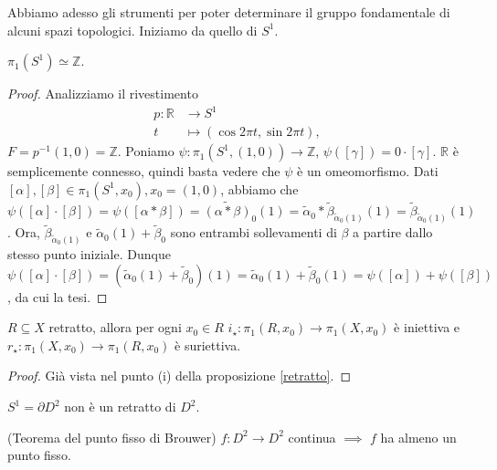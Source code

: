 Abbiamo adesso gli strumenti per poter determinare il gruppo fondamentale di alcuni spazi topologici. Iniziamo da quello di $S^1$.

\begin{thm}
  $\pi_1(S^1) \simeq \mathbb{Z}$.
\end{thm}

\begin{proof}
  Analizziamo il rivestimento
  \begin{align*}
    p: \mathbb{R} &\longrightarrow S^1 \\
    t &\longmapsto (\cos{2\pi t}, \sin{2\pi t}),
  \end{align*}
  $F=p^{-1}(1, 0)=\mathbb{Z}$. Poniamo $\psi:\pi_1(S^1, (1, 0)) \longrightarrow \mathbb{Z}$, $\psi([\gamma])=0 \cdot [\gamma]$. $\mathbb{R}$ è semplicemente connesso, quindi basta vedere che $\psi$ è un omeomorfismo.
  Dati $[\alpha], [\beta] \in \pi_1(S^1, x_0), x_0=(1, 0)$,
  abbiamo che $\psi([\alpha] \cdot [\beta])=\psi([\alpha * \beta])=\widetilde{(\alpha * \beta)}_0(1)=\tilde{\alpha}_0*\tilde{\beta}_{\tilde{\alpha}_0(1)}(1)=\tilde{\beta}_{\tilde{\alpha}_0(1)}(1)$.
  Ora, $\tilde{\beta}_{\tilde{\alpha}_0(1)}$ e $\tilde{\alpha}_0(1)+\tilde{\beta}_0$ sono entrambi sollevamenti di $\beta$ a partire dallo stesso punto iniziale.
  Dunque $\psi([\alpha] \cdot [\beta])=(\tilde{\alpha}_0(1)+\tilde{\beta}_0)(1)=\tilde{\alpha}_0(1)+\tilde{\beta}_0(1)=\psi([\alpha])+\psi([\beta])$, da cui la tesi.
\end{proof}

\begin{prop}
  $R \subseteq X$ retratto, allora per ogni $x_0 \in R$ $i_{\star}: \pi_1(R, x_0) \longrightarrow \pi_1(X, x_0)$ è iniettiva e $r_{\star}: \pi_1(X, x_0) \longrightarrow \pi_1(R, x_0)$ è suriettiva.
\end{prop}

\begin{proof}
  Già vista nel punto (i) della proposizione \ref{retratto}.
\end{proof}

\begin{cor}
  $S^1=\partial D^2$ non è un retratto di $D^2$.
\end{cor}

\begin{thm}
  (Teorema del punto fisso di Brouwer) $f:D^2 \longrightarrow D^2$ continua $\implies$ $f$ ha almeno un punto fisso.
\end{thm}

